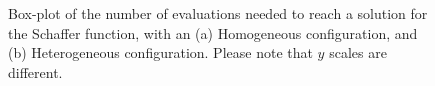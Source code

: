 \documentclass[conference]{IEEEtran}
\begin{document}
\begin{figure}[t]
    \centering


    \caption{Box-plot of the number
      of evaluations needed to reach a solution for the Schaffer function, with an (a)
      Homogeneous configuration, and (b) Heterogeneous
      configuration. Please note that $y$ scales are different.}
    \label{fig:schaffer}
\end{figure}
%
\end{document}
